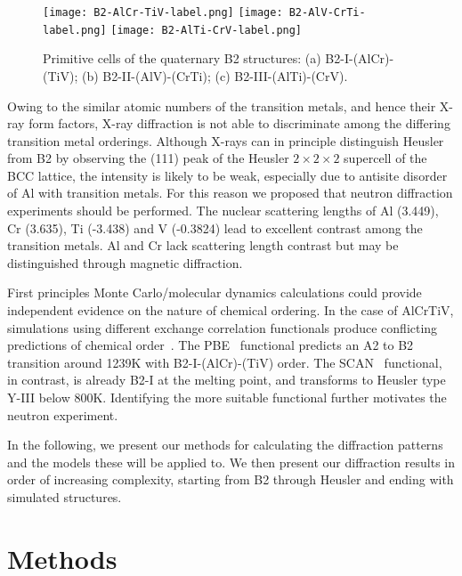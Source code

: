 \documentclass[twoside,12pt]{article}
\begin{document}
\begin{figure}[h!]
  \texttt{[image: B2-AlCr-TiV-label.png]}
  \texttt{[image: B2-AlV-CrTi-label.png]}
  \texttt{[image: B2-AlTi-CrV-label.png]}
  \caption{\label{fig:cP2} Primitive cells of the quaternary B2 structures: (a) B2-I-(AlCr)-(TiV); (b) B2-II-(AlV)-(CrTi); (c) B2-III-(AlTi)-(CrV).}
\end{figure}

Owing to the similar atomic numbers of the transition metals, and hence their X-ray form factors, X-ray diffraction is not able to discriminate among the differing transition metal orderings. Although X-rays can in principle distinguish Heusler from B2 by observing the (111) peak of the Heusler $2\times 2\times 2$ supercell of the BCC lattice, the intensity is likely to be weak, especially due to antisite disorder of Al with transition metals. For this reason we proposed that neutron diffraction experiments should be performed. The nuclear scattering lengths of Al (3.449), Cr (3.635), Ti (-3.438) and V (-0.3824) lead to excellent contrast among the transition metals. Al and Cr lack scattering length contrast but may be distinguished through magnetic diffraction.

First principles Monte Carlo/molecular dynamics calculations could provide independent evidence on the nature of chemical ordering. In the case of AlCrTiV, simulations using different exchange correlation functionals produce conflicting predictions of chemical order~\cite{Widom_2024}. The PBE~\cite{Perdew96} functional predicts an A2 to B2 transition around 1239K with B2-I-(AlCr)-(TiV) order. The SCAN~\cite{r2SCAN} functional, in contrast, is already B2-I at the melting point, and transforms to Heusler type Y-III below 800K. Identifying the more suitable functional further motivates the neutron experiment.

In the following, we present our methods for calculating the diffraction patterns and the models these will be applied to. We then present our diffraction results in order of increasing complexity, starting from B2 through Heusler and ending with simulated structures.

\section{Methods}
\label{sec:methods}
\end{document}
